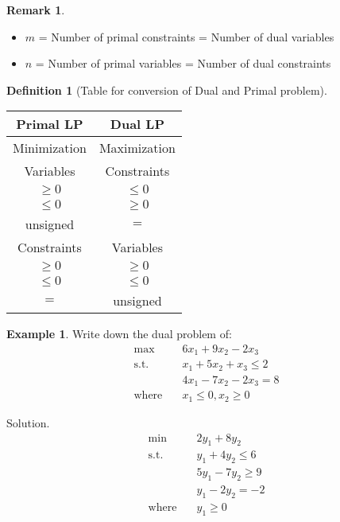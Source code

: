 \documentclass{article}
\theoremstyle{definition}
\newtheorem{definition}{Definition}[section]
\newtheorem{example}{Example}[section]
\newtheorem*{remark}{Remark}
\begin{document}
	\begin{remark}\hfill
	    \begin{itemize}
	        \item $m$ = Number of primal constraints = Number of dual variables
	        \item $n$ = Number of primal variables = Number of dual constraints
	    \end{itemize}
	\end{remark}

	\begin{definition}[Table for conversion of Dual and Primal problem]\hfill\break
	    \begin{center}
		\begin{tabular}{ c|c } 
 			Primal LP & Dual LP \\ 
			\hline
 			Minimization & Maximization \\ 
			\hline
 			Variables & Constraints \\
			$\geq 0$ & $\leq 0$\\
			$\leq 0$ & $\geq 0$\\
			unsigned & $=$\\
			\hline
			Constraints & Variables\\
			$\geq 0$ & $\geq 0$\\
			$\leq 0$ & $\leq 0$\\
			$=$ & unsigned\\
		\end{tabular}
		\end{center}
		\hfill
	\end{definition}

	\begin{example}
		Write down the dual problem of:
		\begin{align*}
			\text{max} \quad& 6x_1+9x_2-2x_3 \\
			\text{s.t.} \quad& x_1+5x_2+x_3\leq2 \\
			& 4x_1-7x_2-2x_3=8 \\
			\text{where} \quad& x_1 \leq 0, x_2 \geq 0
		\end{align*}

		Solution.
		\begin{align*}	
			\text{min} \quad& 2y_1+8y_2 \\
			\text{s.t.} \quad& y_1+4y_2 \leq 6\\
			& 5y_1 - 7y_2 \geq 9\\
			& y_1-2y_2 = -2\\
			\text{where} \quad& y_1 \geq 0
		\end{align*}
	\end{example}
\end{document}
